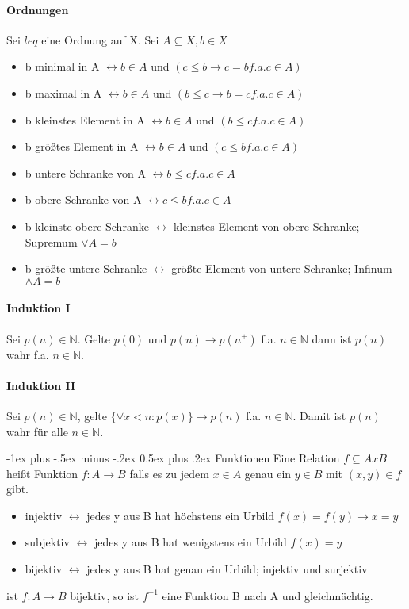 \documentclass[10pt,landscape]{article}
\makeatletter
\renewcommand{\section}{\@startsection{section}{1}{0mm}%
                                {-1ex plus -.5ex minus -.2ex}%
                                {0.5ex plus .2ex}%
                                {\normalfont\large\bfseries}}
\makeatother
\begin{document}
\begin{multicols}{3}
\paragraph{Ordnungen}
Sei $leq$ eine Ordnung auf X. Sei $A\subseteq X, b\in X$
\begin{itemize}
    \item b minimal in A $\leftrightarrow b\in A$ und $(c\leq b \rightarrow c=b f.a. c\in A)$
    \item b maximal in A $\leftrightarrow b\in A$ und $(b\leq c \rightarrow b=c f.a. c\in A)$
    \item b kleinstes Element in A $\leftrightarrow b\in A$ und $(b\leq c f.a. c\in A)$
    \item b größtes Element in A $\leftrightarrow b\in A$ und $(c\leq b f.a. c\in A)$
    \item b untere Schranke von A $\leftrightarrow b\leq c f.a. c\in A$
    \item b obere Schranke von A $\leftrightarrow c\leq b f.a. c\in A$
    \item b kleinste obere Schranke $\leftrightarrow$ kleinstes Element von obere Schranke; Supremum $\lor A = b$
    \item b größte untere Schranke $\leftrightarrow$ größte Element von untere Schranke; Infinum $\land A = b$
\end{itemize}

\paragraph{Induktion I}
Sei $p(n)\in \mathbb{N}$. Gelte $p(0)$ und $p(n)\rightarrow p(n^{+})$ f.a. $n\in \mathbb{N}$ dann ist $p(n)$ wahr f.a. $n \in \mathbb{N}$. 

\paragraph{Induktion II}
Sei $p(n)\in \mathbb{N}$, gelte $\{\forall x < n: p(x)\} \rightarrow p(n)$ f.a. $n\in \mathbb{N}$. Damit ist $p(n)$ wahr für alle $n\in \mathbb{N}$.

\section{Funktionen}
Eine Relation $f\subseteq A x B$ heißt Funktion $f:A\rightarrow B$ falls es zu jedem $x\in A$ genau ein $y\in B$ mit $(x,y)\in f$ gibt.
\begin{itemize}
    \item injektiv $\leftrightarrow$ jedes y aus B hat höchstens ein Urbild $f(x)=f(y)\rightarrow x=y$
    \item subjektiv $\leftrightarrow$ jedes y aus B hat wenigstens ein Urbild $f(x)=y$
    \item bijektiv $\leftrightarrow$ jedes y aus B hat genau ein Urbild; injektiv und surjektiv
\end{itemize}
ist $f:A\rightarrow B$ bijektiv, so ist $f^{-1}$ eine Funktion B nach A und gleichmächtig.


\end{multicols}
\end{document}
